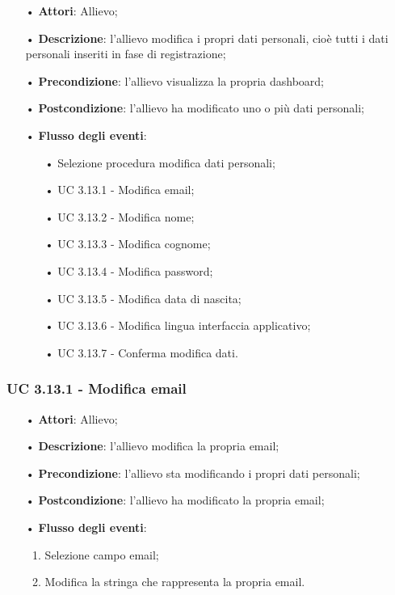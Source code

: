 \begin{itemize}
\item[•] \textbf{Attori}: Allievo;
\item[•] \textbf{Descrizione}: l'allievo modifica i propri dati personali, cioè tutti i dati personali inseriti in fase di registrazione;
\item[•] \textbf{Precondizione}: l'allievo visualizza la propria dashboard;
\item[•] \textbf{Postcondizione}: l'allievo ha modificato uno o più dati personali;
\item[•] \textbf{Flusso degli eventi}:
\begin{enumerate}
	\item[•] Selezione procedura modifica dati personali;
	\item[•] UC 3.13.1 - Modifica email;
	\item[•] UC 3.13.2 - Modifica nome;
	\item[•] UC 3.13.3 - Modifica cognome;
	\item[•] UC 3.13.4 - Modifica password;
	\item[•] UC 3.13.5 - Modifica data di nascita;
	\item[•] UC 3.13.6 - Modifica lingua
	 interfaccia applicativo;
	\item[•] UC 3.13.7 - Conferma modifica dati.
\end{enumerate}
\end{itemize}


\subsubsection{UC 3.13.1 - Modifica email}
\begin{itemize}
	\item[•]\textbf{Attori}: Allievo;
	\item[•]\textbf{Descrizione}: l'allievo modifica la propria email;
	\item[•]\textbf{Precondizione}: l'allievo sta modificando i propri dati personali;
	\item[•]\textbf{Postcondizione}: l'allievo ha modificato la propria email; 
	\item[•]\textbf{Flusso degli eventi}: 
	\begin{enumerate}
		\item Selezione campo email;
		\item Modifica la stringa che rappresenta la propria email.
	\end{enumerate}
\end{itemize}
